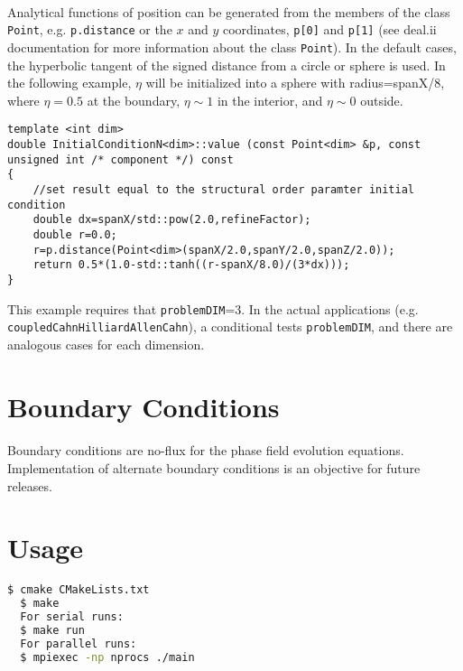\documentclass[11pt]{article}
\begin{document}
\paragraph{}
Analytical functions of position can be generated from the members of the class \texttt{Point}, e.g. \texttt{p.distance} or the $x$ and $y$ coordinates, \texttt{p[0]} and \texttt{p[1]} (see deal.ii documentation for more information about the class \texttt{Point}).  In the default cases,  the hyperbolic tangent of the signed distance from a circle or sphere is used.  In the following example, $\eta$ will be initialized into a sphere with radius=spanX/8, where $\eta=0.5$ at the boundary, $\eta \sim 1$ in the interior, and $\eta \sim 0$ outside.
\begin{lstlisting}
template <int dim>
double InitialConditionN<dim>::value (const Point<dim> &p, const unsigned int /* component */) const
{
	//set result equal to the structural order paramter initial condition
	double dx=spanX/std::pow(2.0,refineFactor);
	double r=0.0;
	r=p.distance(Point<dim>(spanX/2.0,spanY/2.0,spanZ/2.0));
	return 0.5*(1.0-std::tanh((r-spanX/8.0)/(3*dx)));
}
\end{lstlisting}
This example requires that \texttt{problemDIM}=3.  In the actual applications (e.g. \\\texttt{coupledCahnHilliardAllenCahn}), a conditional tests  \texttt{problemDIM}, and there are analogous cases for each dimension.


\section{Boundary Conditions}
\paragraph{}
Boundary conditions are no-flux for the phase field evolution equations.  Implementation of alternate boundary conditions is an objective for future releases.

\section{Usage}
\paragraph{}
\noindent
\begin{lstlisting}[language=bash]
  $ cmake CMakeLists.txt
  $ make
  For serial runs:
  $ make run
  For parallel runs:
  $ mpiexec -np nprocs ./main
\end{lstlisting}
\end{document}
